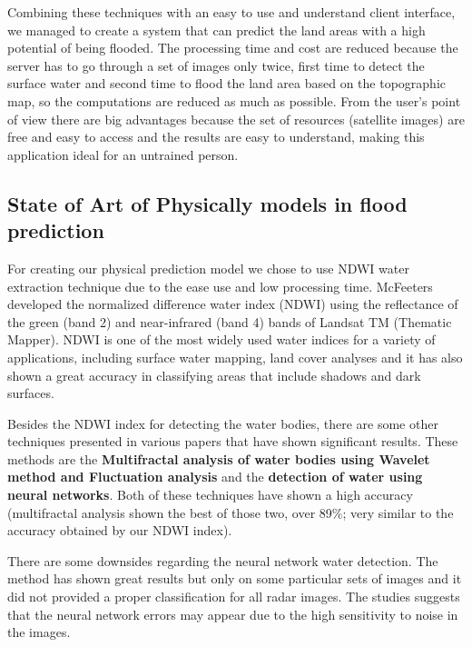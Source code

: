 \documentclass[12pt, a4paper]{report}
\begin{document}
Combining these techniques with an easy to use and understand client interface, we managed to create a system that can predict the land areas with a high potential of being flooded. The processing time and cost are reduced because the server has to go through a set of images only twice, first time to detect the surface water and second time to flood the land area based on the topographic map, so the computations are reduced as much as possible. From the user's point of view there are big advantages because the set of resources (satellite images) are free and easy to access and the results are easy to understand, making this application ideal for an untrained person.
\par





\subsection{State of Art of Physically models in flood prediction}

\quad
For creating our physical prediction model we chose to use NDWI water extraction technique due to the ease use and low processing time. McFeeters \cite{McFeeters} developed the normalized difference water index (NDWI) using the reflectance of the green (band 2) and near-infrared (band 4) bands of Landsat TM (Thematic Mapper). NDWI is one of the most widely used water indices for a variety of applications, including surface water mapping, land cover analyses \cite{Duan, Poulin, Hui} and it has also shown a great accuracy in classifying areas that include shadows and dark surfaces.
\par 

Besides the NDWI index for detecting the water bodies, there are some other techniques presented in various papers \cite{Multifractal water analysis, NDWI Comparison} that have shown significant results. These methods are the \textbf{Multifractal analysis of water bodies using Wavelet method and Fluctuation analysis} and the \textbf{detection of water using neural networks}. Both of these techniques have shown a high accuracy (multifractal analysis shown the best of those two, over 89\%; very similar to the accuracy obtained by our NDWI index).
\par 
There are some downsides regarding the neural network water detection. The method has shown great results but only on some particular sets of images and it did not provided a proper classification for all radar images. The studies \cite{NDWI Comparison} suggests that the neural network errors may appear due to the high sensitivity to noise in the images. 
\par 
\end{document}
